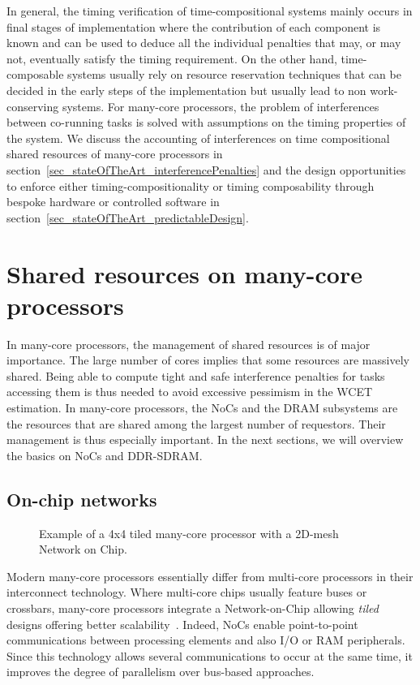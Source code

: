 \documentclass[main.tex]{subfiles}
\begin{document}
In general, the timing verification of time-compositional systems mainly occurs
in final stages of implementation where the contribution of each component is
known and can be used to deduce all the individual penalties that may, or may
not, eventually satisfy the timing requirement. On the other hand,
time-composable systems usually rely on resource reservation techniques that
can be decided in the early steps of the implementation but usually lead to non
work-conserving systems. For many-core processors, the problem of interferences
between co-running tasks is solved with assumptions on the timing properties of
the system. We discuss the accounting of interferences on time compositional
shared resources of many-core processors in
section~\ref{sec_stateOfTheArt_interferencePenalties} and the design
opportunities to enforce either timing-compositionality or timing composability
through bespoke hardware or controlled software in
section~\ref{sec_stateOfTheArt_predictableDesign}.



\section{Shared resources on many-core processors}
\label{sec_stateOfTheArt_accountInterferences}

In many-core processors, the management of shared resources is of major
importance. The large number of cores implies that some resources are massively
shared. Being able to compute tight and safe interference penalties for tasks
accessing them is thus needed to avoid excessive pessimism in the WCET
estimation. In many-core processors, the NoCs and the DRAM subsystems are the
resources that are shared among the largest number of requestors. Their
management is thus especially important.  In the next sections, we will
overview the basics on NoCs and DDR-SDRAM. 

\subsection{On-chip networks}
\begin{figure}
    \centering
    \scalebox{0.7}{}
    \caption{Example of a 4x4 tiled many-core processor with a 2D-mesh Network
    on Chip.}
    \label{fig_stateOfTheArt_NoC}
\end{figure}
Modern many-core processors essentially differ from multi-core processors in
their interconnect technology. Where multi-core chips usually feature buses or
crossbars, many-core processors integrate a Network-on-Chip allowing
\emph{tiled} designs offering better scalability~\cite{Taylor2007, Borkar2011}.
Indeed, NoCs enable point-to-point communications between processing elements
and also I/O or RAM peripherals. Since this technology allows several
communications to occur at the same time, it improves the degree of parallelism
over bus-based approaches.
\end{document}
